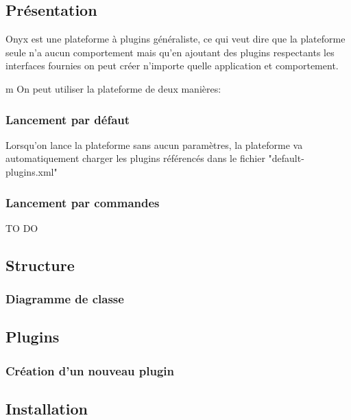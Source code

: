 \subsection{Présentation}

Onyx est une plateforme à plugins généraliste, ce qui veut dire que la plateforme seule n'a aucun comportement mais qu'en ajoutant des plugins respectants les interfaces fournies on peut créer n'importe quelle application et comportement.

m
On peut utiliser la plateforme de deux manières:


\subsubsection{Lancement par défaut}

Lorsqu'on lance la plateforme sans aucun paramètres, la plateforme va automatiquement charger les plugins référencés dans le fichier "default-plugins.xml"

\subsubsection{Lancement par commandes}

TO DO

\subsection{Structure}

\subsubsection{Diagramme de classe}

\subsection{Plugins}

\subsubsection{Création d'un nouveau plugin}

\subsection{Installation}

